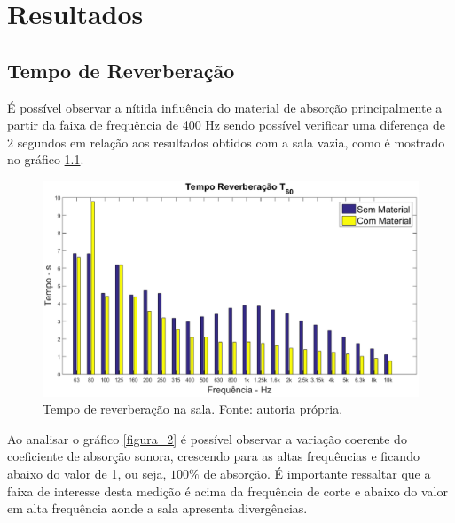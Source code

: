 \chapter{Resultados}\label{resultados}

\section{Tempo de Reverberação} %

É possível observar a nítida influência do material de absorção principalmente a partir da faixa de frequência de 400 Hz sendo possível verificar uma diferença de 2 segundos em relação aos resultados obtidos com a sala vazia, como é mostrado no gráfico \ref{figura_1}.

\begin{figure}[h!]
    \centering
    \includegraphics[width=1.2\textwidth]{imagem1.eps}
    \caption{Tempo de reverberação na sala. Fonte: autoria própria.}
    \label{figura_1}
\end{figure}

Ao analisar o gráfico \ref{figura_2} é possível observar a variação coerente do coeficiente de absorção sonora, crescendo para as altas frequências e ficando abaixo do valor de 1, ou seja, $100\%$ de absorção. É importante ressaltar que a faixa de interesse desta medição é acima da frequência de corte e abaixo do valor em alta frequência aonde a sala apresenta divergências.


